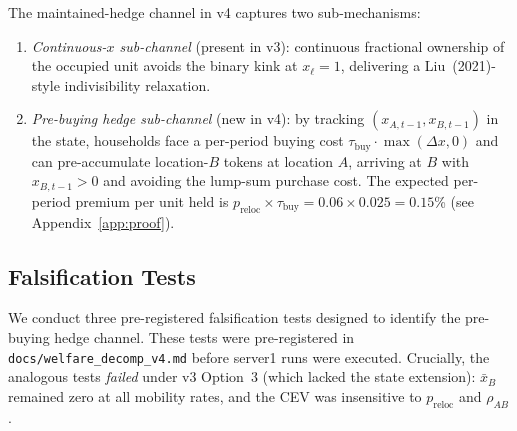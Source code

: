 The maintained-hedge channel in v4 captures two sub-mechanisms:
\begin{enumerate}
    \item \emph{Continuous-$x$ sub-channel} (present in v3): continuous
    fractional ownership of the occupied unit avoids the binary kink at
    $x_\ell = 1$, delivering a Liu~(2021)-style indivisibility relaxation.
    \item \emph{Pre-buying hedge sub-channel} (new in v4): by tracking
    $(x_{A,t-1}, x_{B,t-1})$ in the state, households face a per-period
    buying cost $\tau_{\text{buy}} \cdot \max(\Delta x, 0)$ and can
    pre-accumulate location-$B$ tokens at location $A$, arriving at $B$
    with $x_{B,t-1} > 0$ and avoiding the lump-sum purchase cost.
    The expected per-period premium per unit held is
    $p_{\text{reloc}} \times \tau_{\text{buy}} = 0.06 \times 0.025 = 0.15$\%
    (see Appendix~\ref{app:proof}).
\end{enumerate}

\subsection{Falsification Tests}
\label{sec:results:falsification}

We conduct three pre-registered falsification tests designed to identify
the pre-buying hedge channel.
These tests were pre-registered in \texttt{docs/welfare\_decomp\_v4.md}
before server1 runs were executed.
Crucially, the analogous tests \emph{failed} under v3 Option~3 (which lacked
the state extension): $\bar{x}_B$ remained zero at all mobility rates,
and the CEV was insensitive to $p_{\text{reloc}}$ and $\rho_{AB}$.

